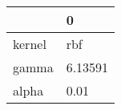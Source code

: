 \begin{tabular}{ll}
\toprule
{} &        0 \\
\midrule
kernel &      rbf \\
gamma  &  6.13591 \\
alpha  &     0.01 \\
\bottomrule
\end{tabular}
